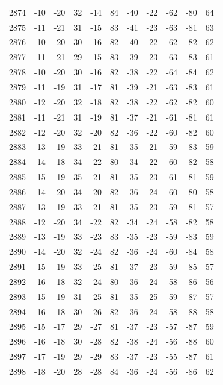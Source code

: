 \begin{table}[H]
\begin{tabular}{lllllllllll}
2874 & -10 & -20 & 32 & -14 & 84 & -40 & -22 & -62 & -80 & 64 \\
2875 & -11 & -21 & 31 & -15 & 83 & -41 & -23 & -63 & -81 & 63 \\
2876 & -10 & -20 & 30 & -16 & 82 & -40 & -22 & -62 & -82 & 62 \\
2877 & -11 & -21 & 29 & -15 & 83 & -39 & -23 & -63 & -83 & 61 \\
2878 & -10 & -20 & 30 & -16 & 82 & -38 & -22 & -64 & -84 & 62 \\
2879 & -11 & -19 & 31 & -17 & 81 & -39 & -21 & -63 & -83 & 61 \\
2880 & -12 & -20 & 32 & -18 & 82 & -38 & -22 & -62 & -82 & 60 \\
2881 & -11 & -21 & 31 & -19 & 81 & -37 & -21 & -61 & -81 & 61 \\
2882 & -12 & -20 & 32 & -20 & 82 & -36 & -22 & -60 & -82 & 60 \\
2883 & -13 & -19 & 33 & -21 & 81 & -35 & -21 & -59 & -83 & 59 \\
2884 & -14 & -18 & 34 & -22 & 80 & -34 & -22 & -60 & -82 & 58 \\
2885 & -15 & -19 & 35 & -21 & 81 & -35 & -23 & -61 & -81 & 59 \\
2886 & -14 & -20 & 34 & -20 & 82 & -36 & -24 & -60 & -80 & 58 \\
2887 & -13 & -19 & 33 & -21 & 81 & -35 & -23 & -59 & -81 & 57 \\
2888 & -12 & -20 & 34 & -22 & 82 & -34 & -24 & -58 & -82 & 58 \\
2889 & -13 & -19 & 33 & -23 & 83 & -35 & -23 & -59 & -83 & 59 \\
2890 & -14 & -20 & 32 & -24 & 82 & -36 & -24 & -60 & -84 & 58 \\
2891 & -15 & -19 & 33 & -25 & 81 & -37 & -23 & -59 & -85 & 57 \\
2892 & -16 & -18 & 32 & -24 & 80 & -36 & -24 & -58 & -86 & 56 \\
2893 & -15 & -19 & 31 & -25 & 81 & -35 & -25 & -59 & -87 & 57 \\
2894 & -16 & -18 & 30 & -26 & 82 & -36 & -24 & -58 & -88 & 58 \\
2895 & -15 & -17 & 29 & -27 & 81 & -37 & -23 & -57 & -87 & 59 \\
2896 & -16 & -18 & 30 & -28 & 82 & -38 & -24 & -56 & -88 & 60 \\
2897 & -17 & -19 & 29 & -29 & 83 & -37 & -23 & -55 & -87 & 61 \\
2898 & -18 & -20 & 28 & -28 & 84 & -36 & -24 & -56 & -86 & 62 \\

\end{tabular}
\end{table}
